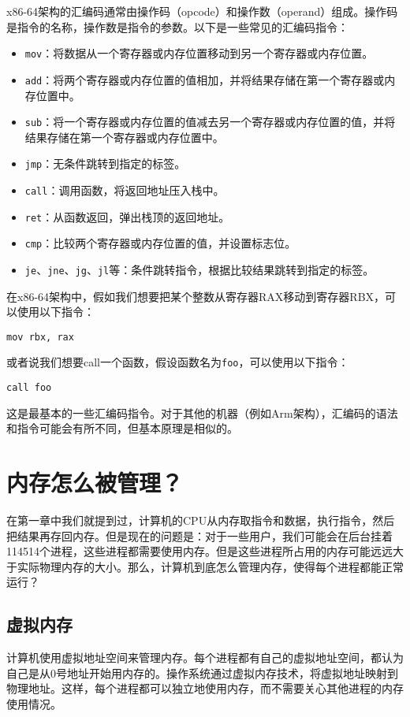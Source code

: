 \documentclass[../main.tex]{subfiles}
\begin{document}
x86-64架构的汇编码通常由操作码（opcode）和操作数（operand）组成。操作码是指令的名称，操作数是指令的参数。以下是一些常见的汇编码指令：
\begin{itemize}
    \item \texttt{mov}：将数据从一个寄存器或内存位置移动到另一个寄存器或内存位置。
    \item \texttt{add}：将两个寄存器或内存位置的值相加，并将结果存储在第一个寄存器或内存位置中。
    \item \texttt{sub}：将一个寄存器或内存位置的值减去另一个寄存器或内存位置的值，并将结果存储在第一个寄存器或内存位置中。
    \item \texttt{jmp}：无条件跳转到指定的标签。
    \item \texttt{call}：调用函数，将返回地址压入栈中。
    \item \texttt{ret}：从函数返回，弹出栈顶的返回地址。
    \item \texttt{cmp}：比较两个寄存器或内存位置的值，并设置标志位。
    \item \texttt{je}、\texttt{jne}、\texttt{jg}、\texttt{jl}等：条件跳转指令，根据比较结果跳转到指定的标签。
\end{itemize}

在x86-64架构中，假如我们想要把某个整数从寄存器RAX移动到寄存器RBX，可以使用以下指令：
\begin{lstlisting}
mov rbx, rax
\end{lstlisting}
或者说我们想要call一个函数，假设函数名为\texttt{foo}，可以使用以下指令：
\begin{lstlisting}
call foo
\end{lstlisting}
这是最基本的一些汇编码指令。对于其他的机器（例如Arm架构），汇编码的语法和指令可能会有所不同，但基本原理是相似的。

\section{内存怎么被管理？}

在第一章中我们就提到过，计算机的CPU从内存取指令和数据，执行指令，然后把结果再存回内存。但是现在的问题是：对于一些用户，我们可能会在后台挂着114514个进程，这些进程都需要使用内存。但是这些进程所占用的内存可能远远大于实际物理内存的大小。那么，计算机到底怎么管理内存，使得每个进程都能正常运行？

\subsection{虚拟内存}

计算机使用虚拟地址空间来管理内存。每个进程都有自己的虚拟地址空间，都认为自己是从0号地址开始用内存的。操作系统通过虚拟内存技术，将虚拟地址映射到物理地址。这样，每个进程都可以独立地使用内存，而不需要关心其他进程的内存使用情况。
\end{document}
